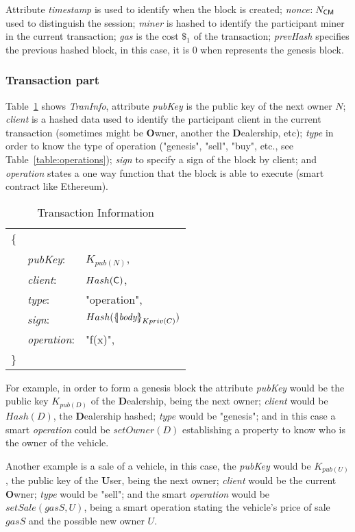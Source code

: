 Attribute \textit{timestamp} is used to identify when the block is created; 
\textit{nonce}$:N_{\textsf{C}\textsf{M}}$ used to distinguish the session; 
\textit{miner} is hashed to identify the participant miner in the current 
transaction;
\textit{gas} is the cost $\$_1$ of the transaction;
\textit{prevHash} specifies the previous hashed block, in this case, it is 0 
when represents the genesis block.

\subsubsection{Transaction part}
Table~\ref{table:TranBlockInfo} shows \textit{TranInfo}, attribute \textit{pubKey} 
is the public key of the next owner $N$; 
\textit{client} is a hashed data used to identify the participant client in the current 
transaction (sometimes might be \textbf{O}wner, another the \textbf{D}ealership, etc); 
\textit{type} in order to know the type of operation ("genesis", "sell", "buy", etc., see Table~\ref{table:operations}); 
\textit{sign} to specify a sign of the block by client; and 
\textit{operation} states a one way function that the block is able to execute (smart contract like Ethereum). 
\begin{table}[ht]
    \centering
    \caption{Transaction Information}
        \begin{tabular}{lll}
            \{  &               &    \\
                & \textit{pubKey}:       & $K_{pub(N)}$, \\
                & \textit{client}:       & $Hash(\textsf{C})$, \\
                & \textit{type}:         & "operation", \\
                & \textit{sign}:         & $Hash(\fat{\textit{body}}_{Kpriv(\client)})$ \\
                & \textit{operation}:    & "f(x)", \\
            \}  &               &   \\
        \end{tabular}
    \label{table:TranBlockInfo}
\end{table}

For example, in order to form a genesis block the attribute \textit{pubKey} would be the 
public key $K_{pub(D)}$ of the \textbf{D}ealership, being 
the next owner; 
\textit{client} would be $Hash(D)$, the \textbf{D}ealership hashed; 
\textit{type} would be "genesis"; and in this case a 
smart \textit{operation} could be $setOwner(D)$ establishing a property to know who is the
owner of the vehicle.

Another example is a sale of a vehicle, in this case, the \textit{pubKey} 
would be $K_{pub(U)}$, the public key of the \textbf{U}ser, being the next owner; 
\textit{client} would be the current \textbf{O}wner; 
\textit{type} would be "sell"; 
and the smart \textit{operation} would be $setSale(\textit{gasS}, U)$, being a smart operation
stating the vehicle's price of sale $gasS$ and the possible new owner $U$.